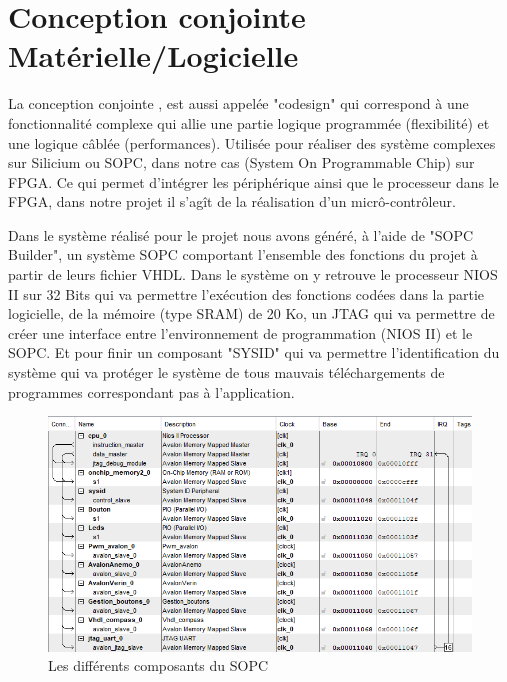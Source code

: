 \section{Conception conjointe Matérielle/Logicielle}
La conception conjointe , est aussi appelée "codesign" qui correspond à une fonctionnalité complexe qui allie une partie logique programmée (flexibilité) et une logique câblée (performances). Utilisée pour réaliser des système complexes sur Silicium ou SOPC, dans notre cas (System On Programmable Chip) sur FPGA. Ce qui permet d'intégrer les périphérique ainsi que le processeur dans le FPGA, dans notre projet il s'agît de la réalisation d'un micrô-contrôleur.\newline

Dans le système réalisé pour le projet nous avons généré, à l'aide de "SOPC Builder", un système SOPC comportant l'ensemble des fonctions du projet à partir de leurs fichier VHDL. Dans le système on y retrouve le processeur NIOS II sur 32 Bits qui va permettre l'exécution des fonctions codées dans la partie logicielle, de la mémoire (type SRAM) de 20 Ko, un JTAG qui va permettre de créer une interface entre l'environnement de programmation (NIOS II) et le SOPC. Et pour finir un composant "SYSID" qui va permettre l'identification du système qui va protéger le système de tous mauvais téléchargements de programmes correspondant pas à l'application.\vspace{0.5cm}
\begin{figure}[h]
    \begin{center}
      \includegraphics[width=\textwidth]{images/SOPC.png}
      \caption{Les différents composants du SOPC}
    \end{center}
  \end{figure}

  \newpage 

